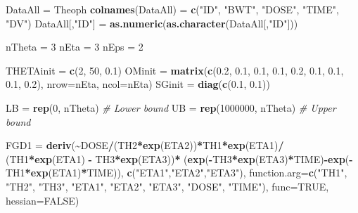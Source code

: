 \documentclass[
  11pt,
  krantz2,
  a4paper]{krantz}
\newenvironment{Shaded}{\begin{snugshade}}{\end{snugshade}}
\newcommand{\CommentTok}[1]{\textcolor[rgb]{0.56,0.35,0.01}{\textit{#1}}}
\newcommand{\DataTypeTok}[1]{\textcolor[rgb]{0.13,0.29,0.53}{#1}}
\newcommand{\DecValTok}[1]{\textcolor[rgb]{0.00,0.00,0.81}{#1}}
\newcommand{\FloatTok}[1]{\textcolor[rgb]{0.00,0.00,0.81}{#1}}
\newcommand{\KeywordTok}[1]{\textcolor[rgb]{0.13,0.29,0.53}{\textbf{#1}}}
\newcommand{\NormalTok}[1]{#1}
\newcommand{\OperatorTok}[1]{\textcolor[rgb]{0.81,0.36,0.00}{\textbf{#1}}}
\newcommand{\OtherTok}[1]{\textcolor[rgb]{0.56,0.35,0.01}{#1}}
\newcommand{\StringTok}[1]{\textcolor[rgb]{0.31,0.60,0.02}{#1}}
\theoremstyle{definition}
\theoremstyle{definition}
\theoremstyle{definition}
\theoremstyle{remark}
\begin{document}
\begin{Shaded}
\begin{Highlighting}[]
\NormalTok{DataAll =}\StringTok{ }\NormalTok{Theoph}
\KeywordTok{colnames}\NormalTok{(DataAll) =}\StringTok{ }\KeywordTok{c}\NormalTok{(}\StringTok{"ID"}\NormalTok{, }\StringTok{"BWT"}\NormalTok{, }\StringTok{"DOSE"}\NormalTok{, }\StringTok{"TIME"}\NormalTok{, }\StringTok{"DV"}\NormalTok{)}
\NormalTok{DataAll[,}\StringTok{"ID"}\NormalTok{] =}\StringTok{ }\KeywordTok{as.numeric}\NormalTok{(}\KeywordTok{as.character}\NormalTok{(DataAll[,}\StringTok{"ID"}\NormalTok{]))}

\NormalTok{nTheta =}\StringTok{ }\DecValTok{3}
\NormalTok{nEta =}\StringTok{ }\DecValTok{3}
\NormalTok{nEps =}\StringTok{ }\DecValTok{2}

\NormalTok{THETAinit =}\StringTok{ }\KeywordTok{c}\NormalTok{(}\DecValTok{2}\NormalTok{, }\DecValTok{50}\NormalTok{, }\FloatTok{0.1}\NormalTok{)}
\NormalTok{OMinit =}\StringTok{ }\KeywordTok{matrix}\NormalTok{(}\KeywordTok{c}\NormalTok{(}\FloatTok{0.2}\NormalTok{, }\FloatTok{0.1}\NormalTok{, }\FloatTok{0.1}\NormalTok{, }\FloatTok{0.1}\NormalTok{, }\FloatTok{0.2}\NormalTok{, }\FloatTok{0.1}\NormalTok{, }\FloatTok{0.1}\NormalTok{, }\FloatTok{0.1}\NormalTok{, }\FloatTok{0.2}\NormalTok{), }
                \DataTypeTok{nrow=}\NormalTok{nEta, }\DataTypeTok{ncol=}\NormalTok{nEta)}
\NormalTok{SGinit =}\StringTok{ }\KeywordTok{diag}\NormalTok{(}\KeywordTok{c}\NormalTok{(}\FloatTok{0.1}\NormalTok{, }\FloatTok{0.1}\NormalTok{))}

\NormalTok{LB =}\StringTok{ }\KeywordTok{rep}\NormalTok{(}\DecValTok{0}\NormalTok{, nTheta) }\CommentTok{\# Lower bound}
\NormalTok{UB =}\StringTok{ }\KeywordTok{rep}\NormalTok{(}\DecValTok{1000000}\NormalTok{, nTheta) }\CommentTok{\# Upper bound}

\NormalTok{FGD1 =}\StringTok{ }\KeywordTok{deriv}\NormalTok{(}\OperatorTok{\textasciitilde{}}\NormalTok{DOSE}\OperatorTok{/}\NormalTok{(TH2}\OperatorTok{*}\KeywordTok{exp}\NormalTok{(ETA2))}\OperatorTok{*}\NormalTok{TH1}\OperatorTok{*}\KeywordTok{exp}\NormalTok{(ETA1)}\OperatorTok{/}
\StringTok{             }\NormalTok{(TH1}\OperatorTok{*}\KeywordTok{exp}\NormalTok{(ETA1) }\OperatorTok{{-}}\StringTok{ }\NormalTok{TH3}\OperatorTok{*}\KeywordTok{exp}\NormalTok{(ETA3))}\OperatorTok{*}
\NormalTok{			 (}\KeywordTok{exp}\NormalTok{(}\OperatorTok{{-}}\NormalTok{TH3}\OperatorTok{*}\KeywordTok{exp}\NormalTok{(ETA3)}\OperatorTok{*}\NormalTok{TIME)}\OperatorTok{{-}}\KeywordTok{exp}\NormalTok{(}\OperatorTok{{-}}\NormalTok{TH1}\OperatorTok{*}\KeywordTok{exp}\NormalTok{(ETA1)}\OperatorTok{*}\NormalTok{TIME)),}
             \KeywordTok{c}\NormalTok{(}\StringTok{"ETA1"}\NormalTok{,}\StringTok{"ETA2"}\NormalTok{,}\StringTok{"ETA3"}\NormalTok{),}
             \DataTypeTok{function.arg=}\KeywordTok{c}\NormalTok{(}\StringTok{"TH1"}\NormalTok{, }\StringTok{"TH2"}\NormalTok{, }\StringTok{"TH3"}\NormalTok{, }\StringTok{"ETA1"}\NormalTok{, }\StringTok{"ETA2"}\NormalTok{, }\StringTok{"ETA3"}\NormalTok{, }
			                \StringTok{"DOSE"}\NormalTok{, }\StringTok{"TIME"}\NormalTok{),}
             \DataTypeTok{func=}\OtherTok{TRUE}\NormalTok{, }\DataTypeTok{hessian=}\OtherTok{FALSE}\NormalTok{)}


\end{Highlighting}
\end{Shaded}
\end{document}
